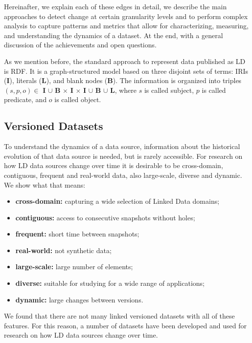 \documentclass[sw]{iosart2x}
\begin{document}
Hereinafter, we explain each of these edges in detail, we describe the main approaches to detect change at certain granularity levels and to perform complex analysis to capture patterns and metrics that allow for characterizing, measuring, and understanding the dynamics of a dataset. At the end, with a general discussion of the achievements and open questions.

As we mention before, the standard approach to represent data published as LD is RDF. It is a graph-structured model based on three disjoint sets of terms: IRIs (\textbf{I}), literals (\textbf{L}), and blank nodes (\textbf{B}). The information is organized into triples $(s,p,o) \in$ \textbf{I} $\cup$ \textbf{B} $\times$ \textbf{I} $\times$ \textbf{I} $\cup$ \textbf{B} $\cup$ \textbf{L}, where $s$ is called subject, $p$ is called predicate, and $o$ is called object. 

\subsection{Versioned Datasets}\label{Datasets}

To understand the dynamics of a data source, information about the historical evolution of that data source is needed, but is rarely accessible. For research on how LD data sources change over time it is desirable to be cross-domain, contiguous, frequent and real-world data, also large-scale, diverse and dynamic. We show what that means:

\begin{itemize}
	
\item \textbf{cross-domain:} capturing a wide selection of Linked Data domains;
\item \textbf{contiguous:} access to consecutive snapshots without holes;
\item \textbf{frequent:} short time between snapshots;
\item \textbf{real-world:} not synthetic data; 
\item \textbf{large-scale:} large number of elements;
\item \textbf{diverse:} suitable for studying for a wide range of applications;
\item \textbf{dynamic:} large changes between versions.

\end{itemize}

We found that there are not many linked versioned datasets with all of these features. For this reason, a number of datasets have been developed and used for research on how LD data sources change over time. 
\end{document}
